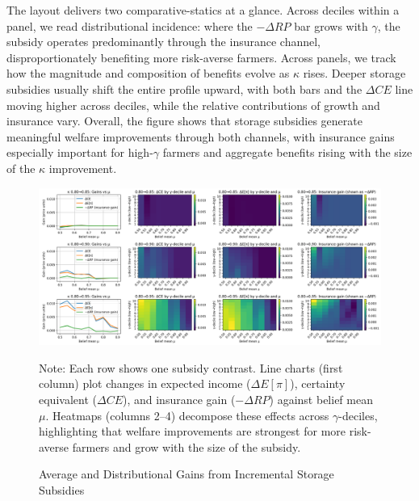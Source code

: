 The layout delivers two comparative-statics at a glance. Across deciles within a panel, we read distributional incidence: where the $-\Delta RP$ bar grows with $\gamma$, the subsidy operates predominantly through the insurance channel, disproportionately benefiting more risk-averse farmers. Across panels, we track how the magnitude and composition of benefits evolve as $\kappa$ rises. Deeper storage subsidies usually shift the entire profile upward, with both bars and the $\Delta CE$ line moving higher across deciles, while the relative contributions of growth and insurance vary. Overall, the figure shows that storage subsidies generate meaningful welfare improvements through both channels, with insurance gains especially important for high-$\gamma$ farmers and aggregate benefits rising with the size of the $\kappa$ improvement.



\begin{figure}[ht!]
    \centering
    \includegraphics[width=\textwidth]{model_figures/storage_subsidy_gain_heatmap.png}
    \caption{Average and Distributional Gains from Incremental Storage Subsidies}
    \label{fig: storage_subsidy_gain_heatmap}
    \begin{tablenotes}
    \footnotesize
    \item Note: Each row shows one subsidy contrast. Line charts (first column) plot changes in expected income ($\Delta E[\pi]$), certainty equivalent ($\Delta CE$), and insurance gain ($-\Delta RP$) against belief mean $\mu$. Heatmaps (columns 2--4) decompose these effects across $\gamma$-deciles, highlighting that welfare improvements are strongest for more risk-averse farmers and grow with the size of the subsidy.
    \end{tablenotes}
\end{figure}


